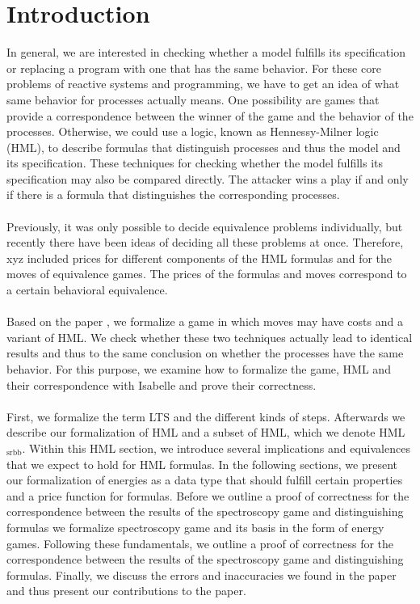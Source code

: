 \newpage
\section{Introduction}
In general, we are interested in checking whether a model fulfills its specification or replacing a program with one that has the same behavior.
For these core problems of reactive systems and programming, we have to get an idea of what same behavior for processes actually means.
One possibility are games that provide a correspondence between the winner of the game and the behavior of the processes.
Otherwise, we could use a logic, known as Hennessy-Milner logic (HML), to describe formulas that distinguish processes and thus the model and its specification.
These techniques for checking whether the model fulfills its specification may also be compared directly.
The attacker wins a play if and only if there is a formula that distinguishes the corresponding processes.
\\\\
Previously, it was only possible to decide equivalence problems individually, but recently there have been ideas of deciding all these problems at once.
Therefore, xyz included prices for different components of the HML formulas and for the moves of equivalence games.
The prices of the formulas and moves correspond to a certain behavioral equivalence.
\\\\
Based on the paper \cite{bisping2023lineartimebranchingtime}, we formalize a game in which moves may have costs and a variant of HML.
We check whether these two techniques actually lead to identical results and thus to the same conclusion on whether the processes have the same behavior.
For this purpose, we examine how to formalize the game, HML and their correspondence with Isabelle and prove their correctness.
\\\\
First, we formalize the term LTS and the different kinds of steps.
Afterwards we describe our formalization of HML and a subset of HML, which we denote HML$_\text{srbb}$.
Within this HML section, we introduce several implications and equivalences that we expect to hold for HML formulas.
In the following sections, we present our formalization of energies as a data type that should fulfill certain properties and a price function for formulas.
Before we outline a proof of correctness for the correspondence between the results of the spectroscopy game and distinguishing formulas we formalize spectroscopy game and its basis in the form of energy games.
Following these fundamentals, we outline a proof of correctness for the correspondence between the results of the spectroscopy game and distinguishing formulas.
Finally, we discuss the errors and inaccuracies we found in the paper and thus present our contributions to the paper\cite{bisping2023lineartimebranchingtime}.